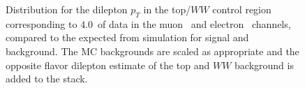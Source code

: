 \begin{figure}[!hbtp]
\begin{center}
\caption{Distribution for the dilepton $p_T$ in the top/$WW$ control region corresponding 
to $4.0$~\ifb of data in the muon~ and electron~ channels, 
compared to the expected from simulation for signal and background. The MC backgrounds are scaled as 
appropriate and the opposite flavor dilepton estimate of the top and $WW$ background is added to the stack.}
\label{fig:topww_dileppt}
\end{center}
\end{figure}

